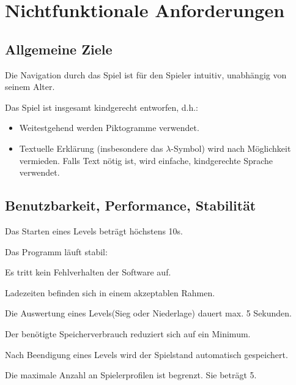 \documentclass{scrartcl}
\begin{document}
\clearpage









\section{Nichtfunktionale Anforderungen}

\subsection{Allgemeine Ziele}

\begin{nflist}
    \item Die Navigation durch das Spiel ist für den Spieler intuitiv, unabhängig von seinem Alter.
    \item Das Spiel ist insgesamt kindgerecht entworfen, d.h.:
    \begin{itemize}
    \item Weitestgehend werden Piktogramme verwendet.
    \item Textuelle Erklärung (insbesondere das $\lambda$-Symbol) wird nach Möglichkeit vermieden. Falls Text nötig ist, wird einfache, kindgerechte Sprache verwendet.
    \end{itemize}
\end{nflist}

\subsection{Benutzbarkeit, Performance, Stabilität}
\begin{nflist}[resume]
	\item Das Starten eines Levels beträgt höchstens 10s. 
	\item Das Programm läuft stabil: 
	\begin{nflist}
		\item Es tritt kein Fehlverhalten der Software auf.
		\item Ladezeiten befinden sich in einem akzeptablen Rahmen. 
	\end{nflist}
	\item Die Auswertung eines Levels(Sieg oder Niederlage) dauert max. 5 Sekunden.
	\item Der benötigte Speicherverbrauch reduziert sich auf ein Minimum. 
	\item Nach Beendigung eines Levels wird der Spielstand automatisch gespeichert.
	\item Die maximale Anzahl an Spielerprofilen ist begrenzt. Sie beträgt 5.
\end{nflist}
\end{document}
